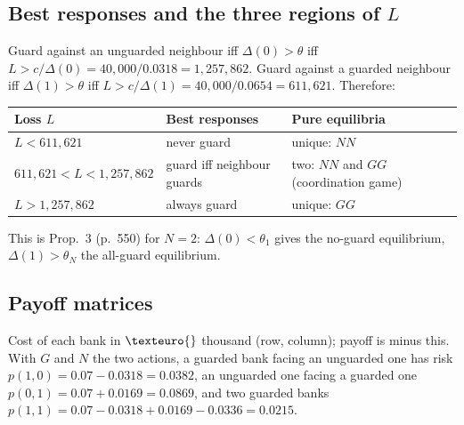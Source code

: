 \documentclass[11pt,a4paper]{article}
\newcommand{\eur}{\texteuro{}}
\newcommand{\Dl}{\Delta}
\begin{document}
\subsection{Best responses and the three regions of $L$}
Guard against an unguarded neighbour iff $\Dl(0)>\theta$ iff $L>c/\Dl(0)=40{,}000/0.0318=1{,}257{,}862$.
Guard against a guarded neighbour iff $\Dl(1)>\theta$ iff $L>c/\Dl(1)=40{,}000/0.0654=611{,}621$. Therefore:
\begin{center}\small
\begin{tabular}{lll}
\toprule
Loss $L$ & Best responses & Pure equilibria \\
\midrule
$L<611{,}621$ & never guard & unique: $NN$ \\
$611{,}621<L<1{,}257{,}862$ & guard iff neighbour guards & two: $NN$ and $GG$ (coordination game) \\
$L>1{,}257{,}862$ & always guard & unique: $GG$ \\
\bottomrule
\end{tabular}
\end{center}
This is Prop.\ 3 (p.\ 550) for $N=2$: $\Dl(0)<\theta_1$ gives the no-guard equilibrium, $\Dl(1)>\theta_N$ the
all-guard equilibrium.

\subsection{Payoff matrices}
Cost of each bank in $\eur$ thousand (row, column); payoff is minus this. With $G$ and $N$ the two
actions, a guarded bank facing an unguarded one has risk $p(1,0)=0.07-0.0318=0.0382$, an unguarded one facing a
guarded one $p(0,1)=0.07+0.0169=0.0869$, and two guarded banks $p(1,1)=0.07-0.0318+0.0169-0.0336=0.0215$.
\end{document}

